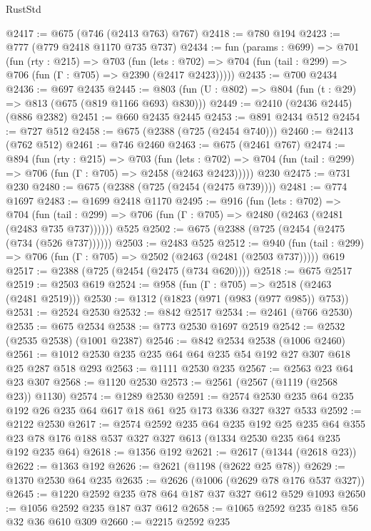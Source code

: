\begin{lexlean}{RustStd}
\begin{coremodule}
@2417 := @675 (@746 (@2413 @763) @767)
@2418 := @780 @194
@2423 := @777 (@779 @2418 @1170 @735 @737)
@2434 := fun (params : @699) =>
  @701
    (fun (rty : @215) =>
    @703
      (fun (lets : @702) =>
      @704 (fun (tail : @299) => @706 (fun (Γ : @705) => @2390 (@2417 @2423)))))
@2435 := @700 @2434
@2436 := @697 @2435
@2445 := @803 (fun (U : @802) => @804 (fun (t : @29) => @813 (@675 (@819 @1166 @693) @830)))
@2449 := @2410 (@2436 @2445) (@886 @2382)
@2451 := @660 @2435 @2445
@2453 := @891 @2434 @512
@2454 := @727 @512
@2458 := @675 (@2388 (@725 (@2454 @740)))
@2460 := @2413 (@762 @512)
@2461 := @746 @2460
@2463 := @675 (@2461 @767)
@2474 := @894
    (fun (rty : @215) =>
    @703
      (fun (lets : @702) =>
      @704 (fun (tail : @299) => @706 (fun (Γ : @705) => @2458 (@2463 @2423)))))
    @230
@2475 := @731 @230
@2480 := @675 (@2388 (@725 (@2454 (@2475 @739))))
@2481 := @774 @1697
@2483 := @1699 @2418 @1170
@2495 := @916
    (fun (lets : @702) =>
    @704 (fun (tail : @299) => @706 (fun (Γ : @705) => @2480 (@2463 (@2481 (@2483 @735 @737))))))
    @525
@2502 := @675 (@2388 (@725 (@2454 (@2475 (@734 (@526 @737))))))
@2503 := @2483 @525
@2512 := @940
    (fun (tail : @299) => @706 (fun (Γ : @705) => @2502 (@2463 (@2481 (@2503 @737)))))
    @619
@2517 := @2388 (@725 (@2454 (@2475 (@734 @620))))
@2518 := @675 @2517
@2519 := @2503 @619
@2524 := @958 (fun (Γ : @705) => @2518 (@2463 (@2481 @2519)))
@2530 := @1312 (@1823 (@971 (@983 (@977 @985)) @753))
@2531 := @2524 @2530
@2532 := @842 @2517
@2534 := @2461 (@766 @2530)
@2535 := @675 @2534
@2538 := @773 @2530 @1697 @2519
@2542 := @2532 (@2535 @2538) (@1001 @2387)
@2546 := @842 @2534 @2538 (@1006 @2460)
@2561 := @1012 @2530 @235 @235 @64 @64 @235 @54 @192 @27 @307 @618 @25 @287 @518 @293
@2563 := @1111 @2530 @235
@2567 := @2563 @23 @64 @23 @307
@2568 := @1120 @2530
@2573 := @2561 (@2567 (@1119 (@2568 @23)) @1130)
@2574 := @1289 @2530
@2591 := @2574 @2530 @235 @64 @235 @192 @26 @235 @64 @617 @18 @61 @25 @173 @336 @327 @327 @533
@2592 := @2122 @2530
@2617 := @2574
    @2592
    @235
    @64
    @235
    @192
    @25
    @235
    @64
    @355
    @23
    @78
    @176
    @188
    @537
    @327
    @327
    @613
    (@1334 @2530 @235 @64 @235 @192 @235 @64)
@2618 := @1356 @192
@2621 := @2617 (@1344 (@2618 @23))
@2622 := @1363 @192
@2626 := @2621 (@1198 (@2622 @25 @78))
@2629 := @1370 @2530 @64 @235
@2635 := @2626 (@1006 (@2629 @78 @176 @537 @327))
@2645 := @1220 @2592 @235 @78 @64 @187 @37 @327 @612 @529 @1093
@2650 := @1056 @2592 @235 @187 @37 @612
@2658 := @1065 @2592 @235 @185 @56 @32 @36 @610 @309
@2660 := @2215 @2592 @235

\end{coremodule}
\end{lexlean}
